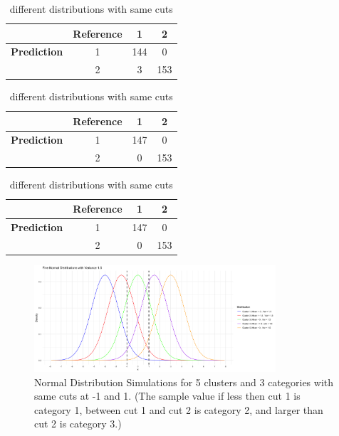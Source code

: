 \documentclass{article}
\begin{document}
\begin{table}[htbp!]
  \centering

  \caption*{\textbf{Confusion matrix of Normal Distributions}}

  \begin{minipage}{0.45\textwidth}
    \centering
    \begin{tabular}{c|c|c|c}
              & \textbf{Reference} & 1 & 2 \\
    \hline
    \textbf{Prediction} & 1 & 144 & 0 \\
                        & 2 & 3 & 153 \\
    \end{tabular}
    \caption{Close center}
    \label{tab:nor_close}
  \end{minipage}
  \hfill
  \begin{minipage}{0.45\textwidth}
    \centering
    \begin{tabular}{c|c|c|c}
              & \textbf{Reference} & 1 & 2 \\
    \hline
    \textbf{Prediction} & 1 & 147 & 0 \\
                        & 2 & 0 & 153 \\
    \end{tabular}
    \caption{Far center}
    \label{tab:nor_far}
  \end{minipage}

  \vspace{1em} %

  \begin{minipage}{0.45\textwidth}
    \centering
    \begin{tabular}{c|c|c|c}
              & \textbf{Reference} & 1 & 2 \\
    \hline
    \textbf{Prediction} & 1 & 147 & 0 \\
                        & 2 & 0 & 153 \\
    \end{tabular}
    \caption{different distributions with same cuts}
    \label{tab:nor_cuts}
  \end{minipage}
\end{table}

\begin{figure}[htbp!]
  \centering
  \includegraphics[width=0.8\textwidth]{images/dist_simu/dist_5_clusters.png}
  \caption{Normal Distribution Simulations for 5 clusters and 3 categories with same cuts at -1 and 1.
   (The sample value if less then cut 1 is category 1, between cut 1 and cut 2 is category 2, and larger than cut 2 is category 3.)
  }
  \label{fig:dist_5_clus}
\end{figure}
\end{document}
